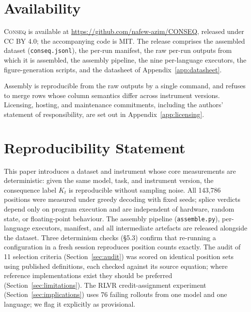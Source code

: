 \documentclass[twoside,11pt]{article}
\begin{document}
\section{Availability}

\textsc{Conseq} is available at \url{https://github.com/nafew-azim/CONSEQ}, released under CC BY 4.0; the accompanying
code is MIT. The release comprises the assembled dataset (\texttt{conseq.jsonl}), the per-run
manifest, the raw per-run outputs from which it is assembled, the assembly pipeline, the nine
per-language executors, the figure-generation scripts, and the datasheet of
Appendix~\ref{app:datasheet}.

Assembly is reproducible from the raw outputs by a single command, and refuses to merge rows whose
column semantics differ across instrument versions. Licensing, hosting, and maintenance commitments,
including the authors' statement of responsibility, are set out in
Appendix~\ref{app:licensing}.

\section*{Reproducibility Statement}

This paper introduces a dataset and instrument whose core measurements are deterministic: given the same model, task, and instrument version, the consequence label $K_t$ is reproducible without sampling noise. All 143,786 positions were measured under greedy decoding with fixed seeds; splice verdicts depend only on program execution and are independent of hardware, random state, or floating-point behaviour. The assembly pipeline (\texttt{assemble.py}), per-language executors, manifest, and all intermediate artefacts are released alongside the dataset. Three determinism checks (\S5.3) confirm that re-running a configuration in a fresh session reproduces position counts exactly. The audit of 11 selection criteria (Section~\ref{sec:audit}) was scored on identical position sets using published definitions, each checked against its source equation; where reference implementations exist they should be preferred (Section~\ref{sec:limitations}). The RLVR credit-assignment experiment (Section~\ref{sec:implications}) uses 76 failing rollouts from one model and one language; we flag it explicitly as provisional.

\end{document}
